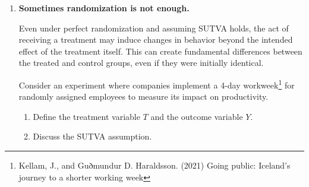 \documentclass[12pt]{article}
\begin{document}
\begin{enumerate}
\begin{enumerate}[label=(\alph*)]
    \item Under uniform randomization, both the treated and control groups are drawn randomly from the same population. 
    In other words, randomization ensures that the expected value of the potential outcomes is the same across treatment and control groups before treatment is assigned. Therefore, it is reasonable to assume that (is it? see the next exercise), in expectation, the counterfactual of one group is equal to the factual of the other. Therefore, the sample means are expected to be similar for a large-enough sample size, that is
    $$
    \frac{1}{n_T} \sum_{i:T_i=1} Y_i(0) \approx \frac{1}{n_C} \sum_{i:T_i=0} Y_i(0),\quad \frac{1}{n_T} \sum_{i:T_i=1} Y_i(1) \approx \frac{1}{n_C} \sum_{i:T_i=0} Y_i(1)
    $$

    \item Since under perfect randomization we have the expectation property above, we can replace the missing counterfactuals with the observed factual outcomes from the opposite group. This leads to:
    $$
    \mathrm{SATE} \approx \frac{1}{n_T} \sum_{i:T_i=1} Y_i(1) - \frac{1}{n_C} \sum_{i:T_i=0} Y_i(0).
    $$
\end{enumerate}

\fi \color{black}

\item \textbf{Sometimes randomization is not enough.}

Even under perfect randomization and assuming SUTVA holds, the act of receiving a treatment may induce changes in behavior beyond the intended effect of the treatment itself. This can create fundamental differences between the treated and control groups, even if they were initially identical.

Consider an experiment where companies implement a 4-day workweek\footnote{Kellam, J., and Guðmundur D. Haraldsson. (2021) Going public: Iceland's journey to a shorter working week} for randomly assigned employees to measure its impact on productivity.

\begin{enumerate}[label=(\alph*)]  
    \item Define the treatment variable \( T \) and the outcome variable \( Y \).

    \item Discuss the SUTVA assumption.


\end{enumerate}
\end{enumerate}
\end{document}
